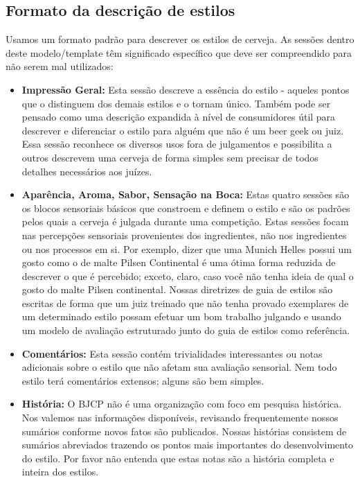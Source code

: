 \subsection*{Formato da descrição de estilos}
Usamos um formato padrão para descrever os estilos de cerveja. As sessões dentro deste modelo/template têm significado específico que deve ser compreendido para não serem mal utilizados:
\begin{itemize}
\item \textbf{Impressão Geral:} Esta sessão descreve a essência do estilo - aqueles pontos que o distinguem dos demais estilos e o tornam único. Também pode ser pensado como uma descrição expandida à nível de consumidores útil para descrever e diferenciar o estilo para alguém que não é um beer geek ou juiz. Essa sessão reconhece os diversos usos fora de julgamentos e possibilita a outros descrevem uma cerveja de forma simples sem precisar de todos detalhes necessários aos juízes.
\item \textbf{Aparência, Aroma, Sabor, Sensação na Boca:} Estas quatro sessões são os blocos sensoriais básicos que constroem e definem o estilo e são os padrões pelos quais a cerveja é julgada durante uma competição. Estas sessões focam nas percepções sensoriais provenientes dos ingredientes, não nos ingredientes ou nos processos em si. Por exemplo, dizer que uma Munich Helles possui um gosto como o de malte Pilsen Continental é uma ótima forma reduzida de descrever o que é percebido; exceto, claro, caso você não tenha ideia de qual o gosto do malte Pilsen continental. Nossas diretrizes de guia de estilos são escritas de forma que um juiz treinado que não tenha provado exemplares de um determinado estilo possam efetuar um bom trabalho julgando e usando um modelo de avaliação estruturado junto do guia de estilos como referência.
\item \textbf{Comentários:} Esta sessão contém trivialidades interessantes ou notas adicionais sobre o estilo que não afetam sua avaliação sensorial. Nem todo estilo terá comentários extensos; alguns são bem simples.
\item \textbf{História:} O BJCP não é uma organização com foco em pesquisa histórica. Nos valemos nas informações disponíveis, revisando frequentemente nossos sumários conforme novos fatos são publicados. Nossas histórias consistem de sumários abreviados trazendo os pontos mais importantes do desenvolvimento do estilo. Por favor não entenda que estas notas são a história completa e inteira dos estilos.

\end{itemize}
